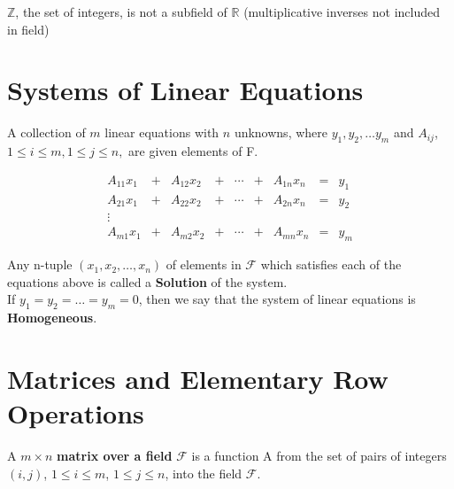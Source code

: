 \documentclass[../Main.tex]{subfiles}
\begin{document}
$\mathbb{Z}$, the set of integers, is not a subfield of $\mathbb{R}$ (multiplicative inverses not included in field)


\section{Systems of Linear Equations}

A collection of $m$ linear equations with $n$ unknowns, where $y_1, y_2, \dots y_{m}$ and $A_{ij}$, $1 \leq i \leq m, 1 \leq j \leq n,$ are given elements of F.

\begin{equation}
	\begin{matrix} \label{linear eq sys}
		A_{11}x_{1} & + & A_{12}x_{2} & + & \cdots & + & A_{1n}x_{n} & = & y_{1} \\
		A_{21}x_{1} & + & A_{22}x_{2} & + & \cdots & + & A_{2n}x_{n} & = & y_{2} \\
		\vdots                                                                   \\
		A_{m1}x_{1} & + & A_{m2}x_{2} & + & \cdots & + & A_{mn}x_{n} & = & y_{m}
	\end{matrix}
\end{equation}

Any n-tuple $(x_1, x_2, \dots, x_n)$ of elements in $\mathcal{F}$ which satisfies each of the equations above is called a \textbf{Solution} of the system.\\
If $y_1=y_2=\dots=y_m=0$, then we say that the system of linear equations is \textbf{Homogeneous}.


\section{Matrices and Elementary Row Operations}

A $m \times n$ \textbf{matrix over a field} $\mathcal{F}$ is a function A from the set of pairs of integers $(i,j)$, $1 \leq i \leq m$, $1 \leq j \leq n$, into the field $\mathcal{F}$.
\end{document}
